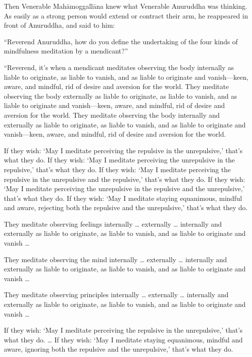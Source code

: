 \documentclass[12pt,openany]{book}%
\begin{document}
Then Venerable \textsanskrit{Mahāmoggallāna} knew what Venerable Anuruddha was thinking. As easily as a strong person would extend or contract their arm, he reappeared in front of Anuruddha, and said to him: 

“Reverend Anuruddha, how do you define the undertaking of the four kinds of mindfulness meditation by a mendicant?” 

“Reverend, it’s when a mendicant meditates observing the body internally as liable to originate, as liable to vanish, and as liable to originate and vanish—keen, aware, and mindful, rid of desire and aversion for the world. They meditate observing the body externally as liable to originate, as liable to vanish, and as liable to originate and vanish—keen, aware, and mindful, rid of desire and aversion for the world. They meditate observing the body internally and externally as liable to originate, as liable to vanish, and as liable to originate and vanish—keen, aware, and mindful, rid of desire and aversion for the world. 

If they wish: ‘May I meditate perceiving the repulsive in the unrepulsive,’ that’s what they do. If they wish: ‘May I meditate perceiving the unrepulsive in the repulsive,’ that’s what they do. If they wish: ‘May I meditate perceiving the repulsive in the unrepulsive and the repulsive,’ that’s what they do. If they wish: ‘May I meditate perceiving the unrepulsive in the repulsive and the unrepulsive,’ that’s what they do. If they wish: ‘May I meditate staying equanimous, mindful and aware, rejecting both the repulsive and the unrepulsive,’ that’s what they do. 

They meditate observing feelings internally … externally … internally and externally as liable to originate, as liable to vanish, and as liable to originate and vanish … 

They meditate observing the mind internally … externally … internally and externally as liable to originate, as liable to vanish, and as liable to originate and vanish … 

They meditate observing principles internally … externally … internally and externally as liable to originate, as liable to vanish, and as liable to originate and vanish … 

If they wish: ‘May I meditate perceiving the repulsive in the unrepulsive,’ that’s what they do. … If they wish: ‘May I meditate staying equanimous, mindful and aware, ignoring both the repulsive and the unrepulsive,’ that’s what they do. 
\end{document}
